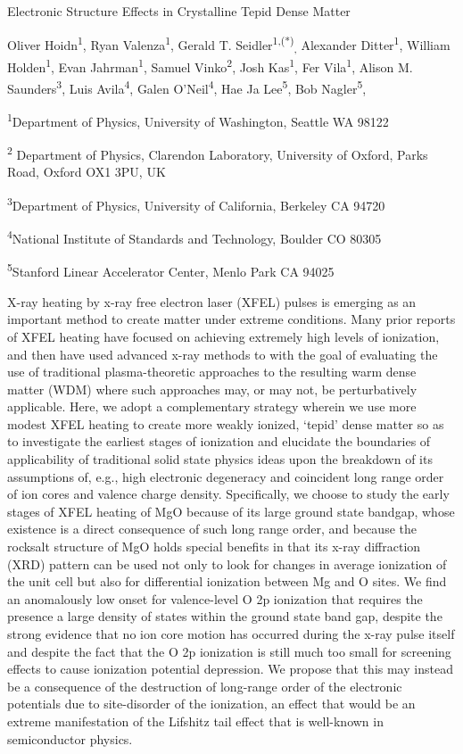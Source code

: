 Electronic Structure Effects in Crystalline Tepid Dense Matter

Oliver Hoidn\textsuperscript{1}, Ryan Valenza\textsuperscript{1}, Gerald
T. Seidler\textsuperscript{1,(*)}\textsubscript{,} Alexander
Ditter\textsuperscript{1}, William Holden\textsuperscript{1}, Evan
Jahrman\textsuperscript{1}, Samuel Vinko\textsuperscript{2}, Josh
Kas\textsuperscript{1}, Fer Vila\textsuperscript{1}, Alison M.
Saunders\textsuperscript{3}, Luis Avila\textsuperscript{4}, Galen
O'Neil\textsuperscript{4}, Hae Ja Lee\textsuperscript{5}, Bob
Nagler\textsuperscript{5},

\textsuperscript{1}Department of Physics, University of Washington,
Seattle WA 98122

\textsuperscript{2} Department of Physics, Clarendon Laboratory,
University of Oxford, Parks Road, Oxford OX1 3PU, UK

\textsuperscript{3}Department of Physics, University of California,
Berkeley CA 94720

\textsuperscript{4}National Institute of Standards and Technology,
Boulder CO 80305

\textsuperscript{5}Stanford Linear Accelerator Center, Menlo Park CA
94025

X-ray heating by x-ray free electron laser (XFEL) pulses is emerging as
an important method to create matter under extreme conditions. Many
prior reports of XFEL heating have focused on achieving extremely high
levels of ionization, and then have used advanced x-ray methods to with
the goal of evaluating the use of traditional plasma-theoretic
approaches to the resulting warm dense matter (WDM) where such
approaches may, or may not, be perturbatively applicable. Here, we adopt
a complementary strategy wherein we use more modest XFEL heating to
create more weakly ionized, `tepid' dense matter so as to investigate
the earliest stages of ionization and elucidate the boundaries of
applicability of traditional solid state physics ideas upon the
breakdown of its assumptions of, e.g., high electronic degeneracy and
coincident long range order of ion cores and valence charge density.
Specifically, we choose to study the early stages of XFEL heating of MgO
because of its large ground state bandgap, whose existence is a direct
consequence of such long range order, and because the rocksalt structure
of MgO holds special benefits in that its x-ray diffraction (XRD)
pattern can be used not only to look for changes in average ionization
of the unit cell but also for differential ionization between Mg and O
sites. We find an anomalously low onset for valence-level O 2p
ionization that requires the presence a large density of states within
the ground state band gap, despite the strong evidence that no ion core
motion has occurred during the x-ray pulse itself and despite the fact
that the O 2p ionization is still much too small for screening effects
to cause ionization potential depression. We propose that this may
instead be a consequence of the destruction of long-range order of the
electronic potentials due to site-disorder of the ionization, an effect
that would be an extreme manifestation of the Lifshitz tail effect that
is well-known in semiconductor physics.

